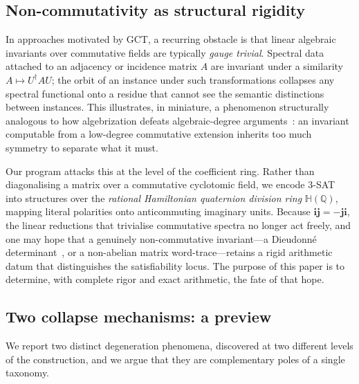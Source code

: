 \documentclass[pdflatex,sn-mathphys-num]{sn-jnl}
\theoremstyle{thmstyleone}%
\theoremstyle{thmstyletwo}%
\theoremstyle{thmstylethree}%
\newcommand{\HH}{\mathbb{H}}
\newcommand{\QQ}{\mathbb{Q}}
\newcommand{\bi}{\mathbf{i}}
\newcommand{\bj}{\mathbf{j}}
\begin{document}
\subsection{Non-commutativity as structural rigidity}

In approaches motivated by GCT, a recurring obstacle is that linear
algebraic invariants over commutative fields are typically \emph{gauge
trivial}. Spectral data attached to an adjacency or incidence matrix $A$
are invariant under a similarity $A\mapsto U^{\dagger}AU$; the orbit of an
instance under such transformations collapses any spectral functional onto
a residue that cannot see the semantic distinctions between instances. This
illustrates, in miniature, a phenomenon structurally analogous to how
algebrization defeats algebraic-degree arguments~\cite{AW}: an invariant
computable from a
low-degree commutative extension inherits too much symmetry to separate
what it must.

Our program attacks this at the level of the coefficient ring. Rather than
diagonalising a matrix over a commutative cyclotomic field, we encode $3$-SAT
into structures over the \emph{rational Hamiltonian quaternion division
ring} $\HH(\QQ)$, mapping literal polarities onto anticommuting imaginary
units. Because $\bi\bj=-\bj\bi$, the linear reductions that trivialise
commutative spectra no longer act freely, and one may hope that a genuinely
non-commutative invariant---a Dieudonn\'e determinant~\cite{Dieudonne}, or a
non-abelian matrix word-trace---retains a rigid arithmetic datum that
distinguishes the satisfiability locus. The purpose of this paper is to
determine, with complete rigor and exact arithmetic, the fate of that hope.

\subsection{Two collapse mechanisms: a preview}

We report two distinct degeneration phenomena, discovered at two different
levels of the construction, and we argue that they are complementary poles
of a single taxonomy.
\end{document}

